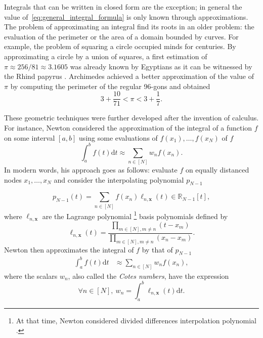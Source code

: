 \documentclass[twoside,11pt]{book}
\numberwithin{theorem}{chapter}
\numberwithin{definition}{chapter}
\numberwithin{proposition}{chapter}
\numberwithin{corollary}{chapter}
\numberwithin{example}{chapter}
\numberwithin{lemma}{chapter}
\DeclareMathOperator{\X}{\mathcal{X}}
\begin{document}
Integrals that can be written in closed form are the exception; in general the value of~\eqref{eq:general_integral_formula} is only known through approximations. The problem of approximating an integral find its roots in an older problem:
the evaluation of the perimeter or the area of a domain bounded by curves. For example, the problem of squaring a circle occupied minds for centuries. By approximating a circle by a union of squares, a first estimation of $\pi \approx 256/81 \approx 3.1605$ was already known by Egyptians as it can be witnessed by the Rhind papyrus \citep{RoSh87}. Archimedes achieved a better approximation of the value of $\pi$ by computing the perimeter of the regular 96-gons and obtained \citep{Hea03}
$$3+\frac{10}{71} < \pi < 3+\frac{1}{7}.$$


 These geometric techniques were further developed after the invention of calculus. For instance, Newton considered the approximation of the integral of a function $f$ on some interval $[a,b]$ using some evaluations of $f(x_{1}), \dots, f(x_{N})$ of $f$
\begin{equation}
\int_{a}^{b}f(t)\mathrm{d}t \approx \sum\limits_{n \in [N]}w_{n}f(x_{n}).
\end{equation}
 In modern words, his approach goes as follows: evaluate $f$ on equally distanced nodes $x_{1}, \dots, x_{N}$ and consider the interpolating polynomial $p_{N-1}$


\begin{equation}
p_{N-1}(t) = \sum\limits_{n \in [N]} f(x_{n}) \ell_{n,\bm{x}}(t) \in \mathbb{R}_{N-1}[t],
\end{equation}
where $\ell_{n,\bm{x}}$ are the Lagrange polynomial  \footnote{ At that time, Newton considered divided differences interpolation polynomial \citep{BuFa97}.} basis polynomials defined by \citep{BuFa97}
\begin{equation}
\ell_{n,\bm{x}}(t) = \frac{\prod\limits_{m \in [N], m \neq n }(t-x_{m})}{\prod\limits_{m \in [N], m \neq n }(x_{n}-x_{m})}.
\end{equation}
Newton then approximates the integral of $f$ by that of $p_{N-1}$
\begin{align}\label{eq:Newton_Cotes}
\int_{a}^{b}f(t)\mathrm{d}t & \approx  \sum\limits_{n \in [N]}w_{n}f(x_{n})  ,
\end{align}
where the scalars $w_{n}$, also called the \emph{Cotes numbers}, have the expression
\begin{equation}
\forall n \in [N], \: w_{n} = \int_{a}^{b} \ell_{n,\bm{x}}(t) \mathrm{d}t.
\end{equation}
\end{document}
